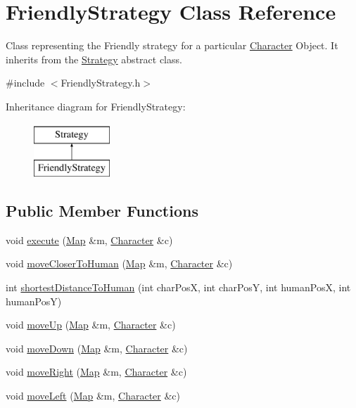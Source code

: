 \hypertarget{classFriendlyStrategy}{}\section{Friendly\+Strategy Class Reference}
\label{classFriendlyStrategy}


Class representing the Friendly strategy for a particular \hyperlink{classCharacter}{Character} Object. It inherits from the \hyperlink{classStrategy}{Strategy} abstract class.  




{\ttfamily \#include $<$Friendly\+Strategy.\+h$>$}

Inheritance diagram for Friendly\+Strategy\+:\begin{figure}[H]
\begin{center}
\leavevmode
\includegraphics[height=2.000000cm]{classFriendlyStrategy}
\end{center}
\end{figure}
\subsection*{Public Member Functions}
\begin{DoxyCompactItemize}
\item 
void \hyperlink{classFriendlyStrategy_a0d09aaf92d63050e081d0509683d073d}{execute} (\hyperlink{classMap}{Map} \&m, \hyperlink{classCharacter}{Character} \&c)
\item 
void \hyperlink{classFriendlyStrategy_a0fe250c462da3ba3bfb3b4f7ea73a4d9}{move\+Closer\+To\+Human} (\hyperlink{classMap}{Map} \&m, \hyperlink{classCharacter}{Character} \&c)
\item 
int \hyperlink{classFriendlyStrategy_abcb7eb9d41c284fecbda4ef3398b84c0}{shortest\+Distance\+To\+Human} (int char\+PosX, int char\+PosY, int human\+PosX, int human\+PosY)
\item 
void \hyperlink{classFriendlyStrategy_a8113bb1bad52faedd1538eed7c01124b}{move\+Up} (\hyperlink{classMap}{Map} \&m, \hyperlink{classCharacter}{Character} \&c)
\item 
void \hyperlink{classFriendlyStrategy_a51c3a2bee7a69fed0edd17ec75ba4591}{move\+Down} (\hyperlink{classMap}{Map} \&m, \hyperlink{classCharacter}{Character} \&c)
\item 
void \hyperlink{classFriendlyStrategy_a7d8f63be4504e8b93e2aee921b2c3a84}{move\+Right} (\hyperlink{classMap}{Map} \&m, \hyperlink{classCharacter}{Character} \&c)
\item 
void \hyperlink{classFriendlyStrategy_a1b3ca725bd0018401cc27d4ff05885b4}{move\+Left} (\hyperlink{classMap}{Map} \&m, \hyperlink{classCharacter}{Character} \&c)
\end{DoxyCompactItemize}


